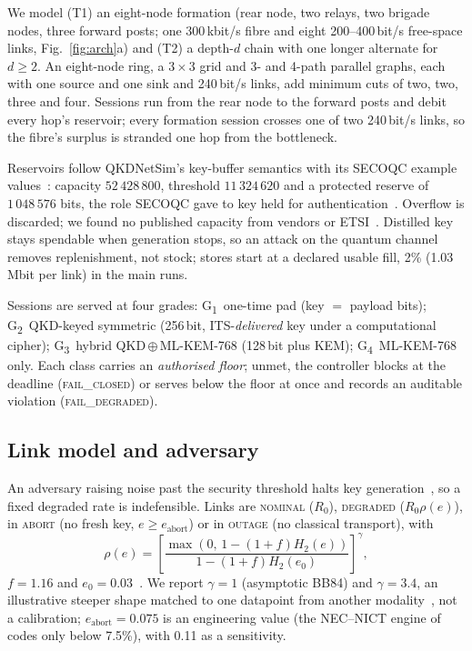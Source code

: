 \documentclass[conference,a4paper]{IEEEtran}
\newcommand{\GI}{G\textsubscript{1}}
\newcommand{\GII}{G\textsubscript{2}}
\newcommand{\GIII}{G\textsubscript{3}}
\newcommand{\GIV}{G\textsubscript{4}}
\begin{document}
We model (T1) an eight-node formation (rear node, two relays, two brigade nodes,
three forward posts; one 300\,kbit/s fibre and eight 200--400\,bit/s free-space
links, Fig.~\ref{fig:arch}a) and (T2) a depth-$d$ chain with one longer alternate for $d\ge2$. An eight-node ring, a $3\times3$ grid and 3- and 4-path parallel graphs, each with one source and one sink and 240\,bit/s links, add minimum cuts of two, two, three and four. Sessions run
from the rear node to the forward posts and debit every hop's reservoir; every
formation session crosses one of two 240\,bit/s links, so the fibre's surplus is
stranded one hop from the bottleneck.

Reservoirs follow QKDNetSim's key-buffer semantics with its SECOQC example
values~\cite{qkdnetsim}: capacity $52\,428\,800$, threshold $11\,324\,620$ and a
protected reserve of $1\,048\,576$ bits, the role SECOQC gave to key held for
authentication~\cite{peev}. Overflow is discarded; we found no published capacity from vendors or ETSI~\cite{etsi014}. Distilled key stays spendable when generation stops, so
an attack on the quantum channel removes replenishment, not stock; stores start at a
declared usable fill, 2\% (1.03\,Mbit per link) in the main runs.

Sessions are served at four grades: \GI\ one-time pad (key $=$ payload bits);
\GII\ QKD-keyed symmetric (256\,bit, ITS-\emph{delivered} key under a computational
cipher); \GIII\ hybrid QKD\,$\oplus$\,ML-KEM-768 (128\,bit plus KEM); \GIV\
ML-KEM-768 only. Each class carries an \emph{authorised floor}; unmet, the
controller blocks at the deadline (\textsc{fail\_closed}) or serves below the floor
at once and records an auditable violation (\textsc{fail\_degraded}).

\subsection{Link model and adversary}\label{sec:link}
An adversary raising noise past the security threshold halts key
generation~\cite{alleaume}, so a fixed degraded rate is indefensible. Links are
\textsc{nominal} ($R_0$), \textsc{degraded} ($R_0\rho(e)$), in \textsc{abort} (no
fresh key, $e\ge e_{\mathrm{abort}}$) or in \textsc{outage} (no classical
transport), with
\begin{equation}\label{eq:rho}
\rho(e)=\left[\frac{\max\!\left(0,\,1-(1+f)H_2(e)\right)}
{1-(1+f)H_2(e_0)}\right]^{\gamma},
\end{equation}
$f=1.16$ and $e_0=0.03$~\cite{sasaki}. We report $\gamma=1$ (asymptotic BB84) and $\gamma=3.4$, an
illustrative steeper shape matched to one datapoint from another
modality~\cite{sasaki}, not a calibration; $e_{\mathrm{abort}}=0.075$ is an
engineering value (the NEC--NICT engine of~\cite{sasaki} codes only below 7.5\%),
with 0.11 as a sensitivity.
\end{document}
